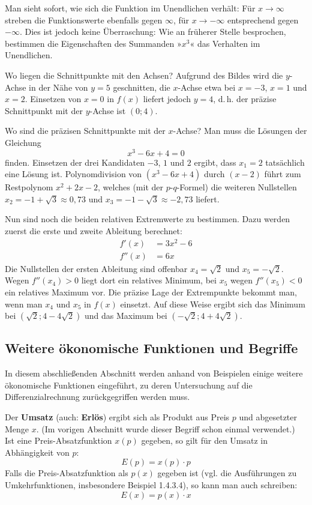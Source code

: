 Man sieht sofort, wie sich die Funktion im Unendlichen verhält: Für $x \rightarrow \infty$ streben die Funktionswerte ebenfalls gegen $\infty$, für $x \rightarrow -\infty$ entsprechend gegen $-\infty$. Dies ist jedoch keine Überraschung: Wie an früherer Stelle besprochen, bestimmen die Eigenschaften des Summanden »$x^3$« das Verhalten im Unendlichen.

Wo liegen die Schnittpunkte mit den Achsen? Aufgrund des Bildes wird die $y$-Achse in der Nähe von $y = 5$ geschnitten, die $x$-Achse etwa bei $x = -3$, $x = 1$ und $x = 2$. Einsetzen von $x = 0$ in $f(x)$ liefert jedoch $y = 4$, d.\,h. der präzise Schnittpunkt mit der $y$-Achse ist $(0;4)$.

Wo sind die präzisen Schnittpunkte mit der $x$-Achse? Man muss die Lösungen der Gleichung
\[ x^3 - 6x + 4 = 0 \]
finden. Einsetzen der drei Kandidaten $-3$, $1$ und $2$ ergibt, dass $x_1 = 2$ tatsächlich eine Lösung ist. Polynomdivision von $(x^3 - 6x + 4)$ durch $(x - 2)$ führt zum Restpolynom $x^2 + 2x - 2$, welches (mit der $p$-$q$-Formel) die weiteren Nullstellen $x_2 = -1 + \sqrt{3} \approx 0{,}73$ und $x_3 = -1 - \sqrt{3} \approx -2{,}73$ liefert.

Nun sind noch die beiden relativen Extremwerte zu bestimmen. Dazu werden zuerst die erste und zweite Ableitung berechnet:
\begin{align*}
  f'(x) &= 3x^2 - 6\\
  f''(x) &= 6x
\end{align*}
Die Nullstellen der ersten Ableitung sind offenbar $x_4 = \sqrt{2}$ und $x_5 = -\sqrt{2}$. Wegen $f''(x_4) > 0$ liegt dort ein relatives Minimum, bei $x_5$ wegen $f''(x_5) < 0$ ein relatives Maximum vor. Die präzise Lage der Extrempunkte bekommt man, wenn man $x_4$ und $x_5$ in $f(x)$ einsetzt. Auf diese Weise ergibt sich das Minimum bei $(\sqrt{2}; 4 - 4\sqrt{2})$ und das Maximum bei $(-\sqrt{2}; 4 + 4\sqrt{2})$.\beispielende

\subsection{Weitere ökonomische Funktionen und Begriffe}

In diesem abschließenden Abschnitt werden anhand von Beispielen einige weitere ökonomische Funktionen eingeführt, zu deren Untersuchung auf die Differenzialrechnung zurückgegriffen werden muss.

Der \textbf{Umsatz} (auch: \textbf{Erlös}) ergibt sich als Produkt aus Preis $p$ und abgesetzter Menge $x$. (Im vorigen Abschnitt wurde dieser Begriff schon einmal verwendet.) Ist eine Preis-Absatzfunktion $x(p)$ gegeben, so gilt für den Umsatz in Abhängigkeit von $p$:
\[ E(p) = x(p) \cdot p \]
Falls die Preis-Absatzfunktion als $p(x)$ gegeben ist (vgl. die Ausführungen zu Umkehrfunktionen, insbesondere Beispiel 1.4.3.4), so kann man auch schreiben:
\[ E(x) = p(x) \cdot x \]

